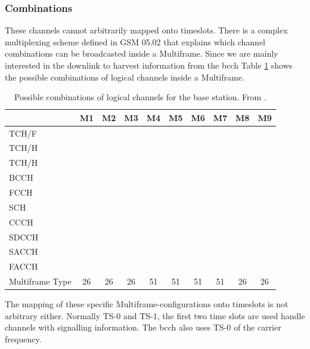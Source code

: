\subsubsection{Combinations}
These channels cannot arbitrarily mapped onto timeslots.
There is a complex multiplexing scheme defined in GSM 05.02 \cite{gsm0502} that explains which channel combinations can be broadcasted inside a Multiframe.
Since we are mainly interested in the downlink to harvest information from the \gls{bcch} Table \ref{tab:channel_configurations} shows the possible combinations of logical channels inside a Multiframe.
\begin{table}
	\centering
	\begin{tabular}{lccccccccc}
	\toprule
						&M1&M2&M3&M4&M5&M6&M7&M8&M9\\
	\midrule
	TCH/F				&\cellcolor[gray]{0.7}&&&&&&&\cellcolor[gray]{0.7}&\cellcolor[gray]{0.7}\\
	TCH/H				&&\cellcolor[gray]{0.7}&\cellcolor[gray]{0.7}&&&&&&\\
	TCH/H				&&&\cellcolor[gray]{0.7}&&&&&&\\
	BCCH				&&&&\cellcolor[gray]{0.7}&\cellcolor[gray]{0.7}&\cellcolor[gray]{0.7}&&&\\
	FCCH				&&&&\cellcolor[gray]{0.7}&\cellcolor[gray]{0.7}&&&&\\
	SCH					&&&&\cellcolor[gray]{0.7}&\cellcolor[gray]{0.7}&&&&\\
	CCCH				&&&&\cellcolor[gray]{0.7}&\cellcolor[gray]{0.7}&\cellcolor[gray]{0.7}&&&\\
	SDCCH				&&&&&\cellcolor[gray]{0.7}&&\cellcolor[gray]{0.7}&&\\
	SACCH				&\cellcolor[gray]{0.7}&\cellcolor[gray]{0.7}&\cellcolor[gray]{0.7}&&\cellcolor[gray]{0.7}&&\cellcolor[gray]{0.7}&\cellcolor[gray]{0.7}&\cellcolor[gray]{0.7}\\
	FACCH				&\cellcolor[gray]{0.7}&\cellcolor[gray]{0.7}&\cellcolor[gray]{0.7}&&&&&\cellcolor[gray]{0.7}&\\
	\midrule
	Multiframe Type		&26&26&26&51&51&51&51&26&26\\
	\bottomrule
	\end{tabular}
	\caption{Possible combinations of logical channels for the base station. From \cite{GSM2009}.}
	\label{tab:channel_configurations}
\end{table}
The mapping of these specific Multiframe-configurations onto timeslots is not arbitrary either.
Normally TS-0 and TS-1, the first two time slots are used handle channels with signalling information.
The \gls{bcch} also uses TS-0 of the carrier frequency.

